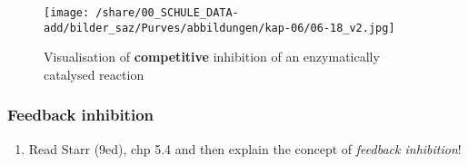 		\begin{figure}[htp]
		  \texttt{[image: /share/00\_SCHULE\_DATA-add/bilder\_saz/Purves/abbildungen/kap-06/06-18\_v2.jpg]}
		  \caption[allosteric inhibition, Purves chp 6 fig 06-18\_v2]{ Visualisation of \textbf{competitive} inhibition of an enzymatically catalysed reaction}
		\label{fig:CompetitiveInhibition}
		\end{figure}
		

		\vspace{2cm} \enlargethispage{1.8cm}
\subsubsection{Feedback inhibition}
		\begin{enumerate}[resume, leftmargin=*]
\item  Read  Starr (9ed), chp 5.4 and then explain the concept of \emph{feedback inhibition}!\\
\end{enumerate}		
\clearpage

% 			
% 	
% 
		
